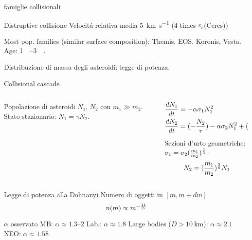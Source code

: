 \begin{wordonframe}{famiglie collisionali}\tolbf
\begin{block}{Distruptive collisione}
Velocit\'a relativa media \SI{5}{\kilo\meter\per\second} (4 times $v_e$(Ceres))
\end{block}
Most pop. families (similar surface composition): Themis, EOS, Koronis, Vesta. Age: \SIrange{1}{3}{\giga\year}.
\end{wordonframe}

\begin{frame}{Distribuzione di massa degli asteroidi: legge di potenza.}
\begin{block}{Collisional cascade}
\begin{columns}[T]\begin{column}{0.5\textwidth}
Popolazione di asteroidi $N_1$, $N_2$ con $m_1\gg m_2$.
Stato stazionario: $N_1=\gamma N_2$.
\end{column}\begin{column}{0.5\textwidth}
\begin{align*}
&\TDy{t}{N_1}=-\alpha\sigma_1N_1^2\\
&\TDy{t}{N_2}=(-\frac{N_2}{\tau})-\alpha\sigma_2N_1^2+(\frac{m_1}{m_2})\alpha\sigma_1N_1^2
\end{align*}
Sezioni d'urto geometriche: $\sigma_1=\sigma_2(\frac{m_1}{m_2})\expy{\frac{2}{3}}$.
\begin{equation*}
N_2=(\frac{m_1}{m_2})\expy{\frac{5}{6}}N_1
\end{equation*}
\end{column}  \end{columns}
\end{block}
\begin{block}{Legge di potenza alla Dohnanyi}
 Numero di oggetti in $[m,m+dm]$
\begin{equation*}
n(m)\propto m\expy{-\frac{11}{6}}
\end{equation*}
\end{block}
\begin{block}{$\alpha$ osservato}
MB: $\alpha\approx\numrange{1.3}{2}$
Lab.: $\alpha\approx1.8$
Large bodies ($D>\SI{10}{\kilo\meter}$): $\alpha\approx2.1$
NEO: $\alpha\approx1.58$
\end{block}
\end{frame}


